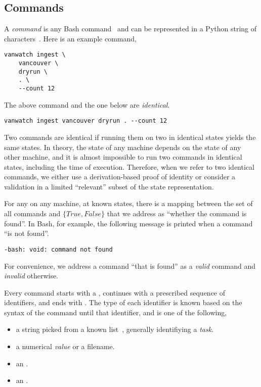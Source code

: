 \subsection{Commands}\label{command}\label{commands}

A \emph{command} is any Bash command~\cite{shell_syntax} and can be represented in a Python string of characters~\cite{python_string}. Here is an example command,
%
\begin{verbatim}
vanwatch ingest \
    vancouver \
    dryrun \
    . \
    --count 12
\end{verbatim}
%
The above command and the one below are \emph{identical}.
%
\begin{verbatim}
vanwatch ingest vancouver dryrun . --count 12
\end{verbatim}
%
Two commands are identical if running them on two  in identical states yields the same states. In theory, the state of any machine depends on the state of any other machine, and it is almost impossible to run two commands in identical states, including the time of execution. Therefore, when we refer to two identical commands, we either use a derivation-based proof of identity or consider a validation in a limited ``relevant'' subset of the state representation.

For any  on any machine, at known states, there is a mapping between the set of all commands and $\{True,False\}$ that we address as ``whether the command is found''. In Bash, for example, the following message is printed when a command ``is not found''.
%
\begin{verbatim}
-bash: void: command not found
\end{verbatim}
%
For convenience, we address a command ``that is found'' as a \emph{valid} command and \emph{invalid} otherwise.

Every command starts with a , continues with a prescribed sequence of identifiers, and ends with \kArguments. The type of each identifier is known based on the syntax of the command until that identifier, and is one of the following,

\begin{itemize}
    \item a string picked from a known list~\cite{python_eunum}, generally identifiying a \emph{task}.
    \item a numerical \emph{value} or a filename.
    \item an .
    \item an .
\end{itemize}